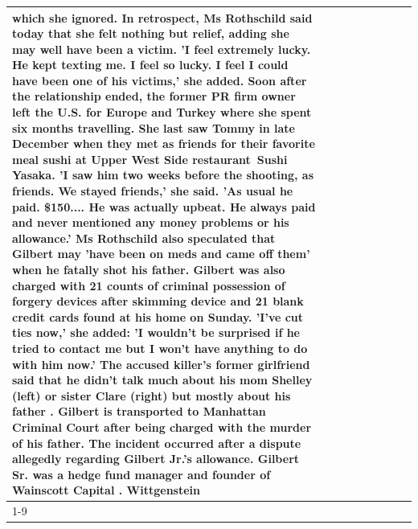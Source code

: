\begin{table}[H]
\begin{tabular}{lllrlllll}
which she ignored. In retrospect, Ms Rothschild said today that she felt nothing but relief, adding she may well have been a victim. 'I feel extremely lucky. He kept texting me. I feel so lucky. I feel I could have been one of his victims,' she added. Soon after the relationship ended, the former PR firm owner left the U.S. for Europe and Turkey where she spent six months  travelling. She last saw Tommy in late December when they met as friends for their favorite meal sushi at Upper West Side restaurant Sushi Yasaka. 'I saw him two weeks before the shooting, as friends. We stayed friends,' she said. 'As usual he paid. \$150.... He was actually upbeat. He always paid and never mentioned any money problems or his allowance.' Ms Rothschild also speculated that Gilbert may 'have been on meds and came off them' when he fatally shot his father. Gilbert was also charged with 21 counts of criminal possession of forgery devices after skimming device and 21 blank credit cards found at his home on Sunday. 'I've cut ties now,' she added: 'I wouldn’t be surprised if he tried to contact me but I won’t have anything to do with him now.' The accused killer's former girlfriend said that he didn't talk much about his mom Shelley (left) or sister Clare (right) but mostly about his father . Gilbert is transported to Manhattan Criminal Court  after being charged with the murder of his father. The incident occurred after a dispute allegedly regarding Gilbert Jr.'s allowance. Gilbert Sr. was a hedge fund manager and founder of Wainscott Capital . Wittgenstein \\
\cline{1-9}

\end{tabular}
\end{table}
